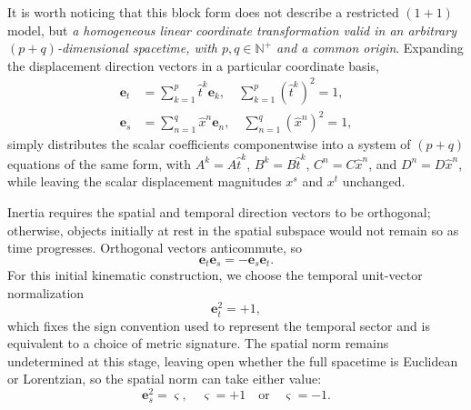 It is worth noticing that this block form does not describe a restricted $(1+1)$ model, but \emph{a homogeneous linear coordinate transformation valid in an arbitrary $(p+q)$-dimensional spacetime, with $p,q\in\mathbb{N}^{+}$ and a common origin}. Expanding the displacement direction vectors in a particular coordinate basis,
\begin{subequations}
\begin{align}
    \mathbf{e}_{t} &= \sum_{k=1}^{p}\hat{t}^{k}\mathbf{e}_{k},\quad \sum_{k=1}^{p}(\hat{t}^{k})^{2} = 1,\\
    \mathbf{e}_{s} &= \sum_{n=1}^{q}\hat{x}^{n}\mathbf{e}_{n},\quad \sum_{n=1}^{q}(\hat{x}^{n})^{2} = 1,
\end{align}
\end{subequations}
simply distributes the scalar coefficients componentwise into a system of $(p+q)$ equations of the same form, with $A^{k} = A\hat{t}^{k}$, $B^{k} = B\hat{t}^{k}$, $C^{n} = C\hat{x}^{n}$, and $D^{n} = D\hat{x}^{n}$, while leaving the scalar displacement magnitudes $x^{s}$ and $x^{t}$ unchanged.

Inertia requires the spatial and temporal direction vectors to be orthogonal; otherwise, objects initially at rest in the spatial subspace would not remain so as time progresses. Orthogonal vectors anticommute, so
\begin{equation}
    \mathbf{e}_{t}\mathbf{e}_{s} = -\mathbf{e}_{s}\mathbf{e}_{t}.
\end{equation}
For this initial kinematic construction, we choose the temporal unit-vector normalization
\begin{equation}
    \mathbf{e}_{t}^{2} = +1,
\end{equation}
which fixes the sign convention used to represent the temporal sector and is equivalent to a choice of metric signature. The spatial norm remains undetermined at this stage, leaving open whether the full spacetime is Euclidean or Lorentzian, so the spatial norm can take either value:
\begin{equation}
    \mathbf{e}_{s}^{2} = \varsigma, \quad \varsigma = +1 \quad \text{or} \quad \varsigma = -1.
\end{equation}

